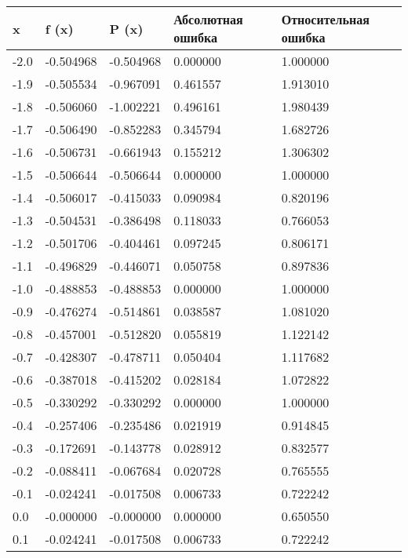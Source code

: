 \documentclass[13pt, a4paper, twoside]{article}
\begin{document}
\begin{table}[!ht]
    \centering
    \begin{tabular}{|l|l|l|l|l|}
    \hline
        x & f (x) & P (x) & Абсолютная ошибка & Относительная ошибка \\ \hline
        -2.0 & -0.504968 & -0.504968 & 0.000000 & 1.000000 \\ \hline
        -1.9 & -0.505534 & -0.967091 & 0.461557 & 1.913010 \\ \hline
        -1.8 & -0.506060 & -1.002221 & 0.496161 & 1.980439 \\ \hline
        -1.7 & -0.506490 & -0.852283 & 0.345794 & 1.682726 \\ \hline
        -1.6 & -0.506731 & -0.661943 & 0.155212 & 1.306302 \\ \hline
        -1.5 & -0.506644 & -0.506644 & 0.000000 & 1.000000 \\ \hline
        -1.4 & -0.506017 & -0.415033 & 0.090984 & 0.820196 \\ \hline
        -1.3 & -0.504531 & -0.386498 & 0.118033 & 0.766053 \\ \hline
        -1.2 & -0.501706 & -0.404461 & 0.097245 & 0.806171 \\ \hline
        -1.1 & -0.496829 & -0.446071 & 0.050758 & 0.897836 \\ \hline
        -1.0 & -0.488853 & -0.488853 & 0.000000 & 1.000000 \\ \hline
        -0.9 & -0.476274 & -0.514861 & 0.038587 & 1.081020 \\ \hline
        -0.8 & -0.457001 & -0.512820 & 0.055819 & 1.122142 \\ \hline
        -0.7 & -0.428307 & -0.478711 & 0.050404 & 1.117682 \\ \hline
        -0.6 & -0.387018 & -0.415202 & 0.028184 & 1.072822 \\ \hline
        -0.5 & -0.330292 & -0.330292 & 0.000000 & 1.000000 \\ \hline
        -0.4 & -0.257406 & -0.235486 & 0.021919 & 0.914845 \\ \hline
        -0.3 & -0.172691 & -0.143778 & 0.028912 & 0.832577 \\ \hline
        -0.2 & -0.088411 & -0.067684 & 0.020728 & 0.765555 \\ \hline
        -0.1 & -0.024241 & -0.017508 & 0.006733 & 0.722242 \\ \hline
        0.0 & -0.000000 & -0.000000 & 0.000000 & 0.650550 \\ \hline
        0.1 & -0.024241 & -0.017508 & 0.006733 & 0.722242 \\ \hline

\end{tabular}
\end{table}
\end{document}
